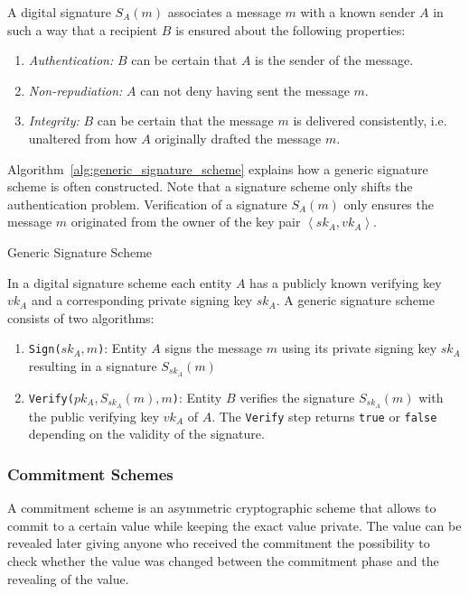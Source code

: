 \begin{defn}
\label{def:digital_signature}
 A digital signature $S_A \left( m \right)$ associates a message $m$ with a known sender $A$ in such a way that a recipient $B$ is ensured about the following properties:
 \begin{enumerate}
  \item \textit{Authentication:} $B$ can be certain that $A$ is the sender of the message.
  \item \textit{Non-repudiation:} $A$ can not deny having sent the message $m$.
  \item \textit{Integrity:} $B$ can be certain that the message $m$ is delivered consistently, i.e. unaltered from how $A$ originally drafted the message $m$.
 \end{enumerate}
\end{defn}

Algorithm~\ref{alg:generic_signature_scheme} explains how a generic signature scheme is often constructed. Note that a signature scheme only shifts the authentication problem. Verification of a signature $S_A \left( m \right)$ only ensures the message $m$ originated from the owner of the key pair $\left< sk_A, vk_A \right>$.
\begin{algorithm}
\caption{Generic Signature Scheme }
\label{alg:generic_signature_scheme}
 \medskip
 In a digital signature scheme each entity $A$ has a publicly known verifying key $vk_A$ and a corresponding private signing key $sk_A$. A generic signature scheme consists of two algorithms:
 \begin{enumerate}
  \item \texttt{Sign($sk_A, m$)}: Entity $A$ signs the message $m$ using its private signing key $sk_A$ resulting in a signature $S_{sk_A} \left( m \right)$
  \item \texttt{Verify($pk_A, S_{sk_A} \left( m \right), m$)}: Entity $B$ verifies the signature $S_{sk_A} \left( m \right)$ with the public verifying key $vk_A$ of $A$. The \texttt{Verify} step returns \texttt{true} or \texttt{false} depending on the validity of the signature.
 \end{enumerate}
\end{algorithm}

\subsubsection{Commitment Schemes}
A commitment scheme is an asymmetric cryptographic scheme that allows to commit to a certain value while keeping the exact value private. The value can be revealed later giving anyone who received the commitment the possibility to check whether the value was changed between the commitment phase and the revealing of the value.

